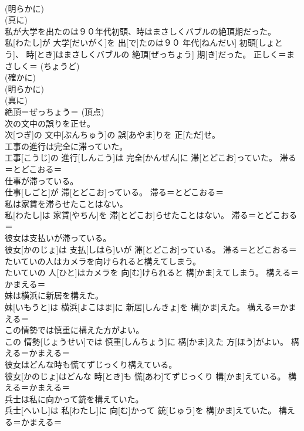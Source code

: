 \documentclass[8pt]{extreport}
\begin{document}
\begin{CJK}{UTF8}{min}
{\\	(明らかに) 
\\	(真に) 
\\	私が大学を出たのは９０年代初頭、時はまさしくバブルの絶頂期だった。	
\\	私[わたし]が 大学[だいがく]を 出[で]たのは９０ 年代[ねんだい] 初頭[しょとう]、 時[とき]はまさしくバブルの 絶頂[ぜっちょう] 期[き]だった。	正しく＝まさしく＝ (ちょうど) 
\\	(確かに) 
\\	(明らかに) 
\\	(真に) 
\\	絶頂＝ぜっちょう＝ (頂点) 
\\	次の文中の誤りを正せ。	
\\	次[つぎ]の 文中[ぶんちゅう]の 誤[あやま]りを 正[ただ]せ。	
\\	工事の進行は完全に滞っていた。	
\\	工事[こうじ]の 進行[しんこう]は 完全[かんぜん]に 滞[とどこお]っていた。	滞る＝とどこおる＝ 
\\	仕事が滞っている。	
\\	仕事[しごと]が 滞[とどこお]っている。	滞る＝とどこおる＝ 
\\	私は家賃を滞らせたことはない。	
\\	私[わたし]は 家賃[やちん]を 滞[とどこお]らせたことはない。	滞る＝とどこおる＝ 
\\	彼女は支払いが滞っている。	
\\	彼女[かのじょ]は 支払[しはら]いが 滞[とどこお]っている。	滞る＝とどこおる＝ 
\\	たいていの人はカメラを向けられると構えてしまう。	
\\	たいていの 人[ひと]はカメラを 向[む]けられると 構[かま]えてしまう。	構える＝かまえる＝ 
\\	妹は横浜に新居を構えた。	
\\	妹[いもうと]は 横浜[よこはま]に 新居[しんきょ]を 構[かま]えた。	構える＝かまえる＝ 
\\	この情勢では慎重に構えた方がよい。	
\\	この 情勢[じょうせい]では 慎重[しんちょう]に 構[かま]えた 方[ほう]がよい。	構える＝かまえる＝ 
\\	彼女はどんな時も慌てずじっくり構えている。	
\\	彼女[かのじょ]はどんな 時[とき]も 慌[あわ]てずじっくり 構[かま]えている。	構える＝かまえる＝ 
\\	兵士は私に向かって銃を構えていた。	
\\	兵士[へいし]は 私[わたし]に 向[む]かって 銃[じゅう]を 構[かま]えていた。	構える＝かまえる＝ 
}
\end{CJK}
\end{document}
